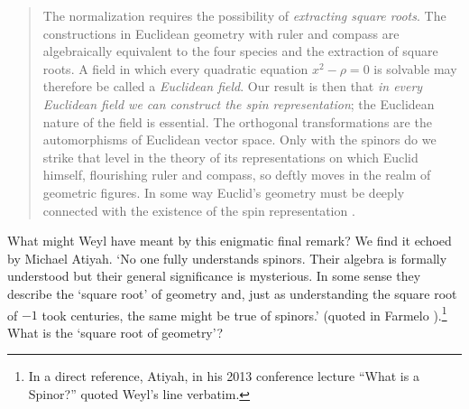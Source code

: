 \documentclass[11pt,oneside,a4paper]{article}
\begin{document}
\begin{quotation}
The normalization requires the possibility of \textit{extracting square roots}. The constructions in Euclidean geometry with ruler and compass are algebraically equivalent to the four species and the extraction of square roots. A field in which every quadratic equation  $x^{2} - \rho = 0$ is solvable may therefore be called a \textit{Euclidean field}. Our result is then that \textit{in every Euclidean field we can construct the spin representation}; the Euclidean nature of the field is essential. The orthogonal transformations are the automorphisms of Euclidean vector space. Only with the spinors do we strike that level in the theory of its representations on which Euclid himself, flourishing ruler and compass, so deftly moves in the realm of geometric figures. In some way Euclid's geometry must be deeply connected with the existence of the spin representation \parencite[273]{weyl_classical_1939}.
\end{quotation}
What might Weyl have meant by this enigmatic final remark? We find it echoed by Michael Atiyah. `No one fully understands spinors. Their algebra is formally understood but their general significance is mysterious. In some sense they describe the `square root' of geometry and, just as understanding the square root of $-1$ took centuries, the same might be true of spinors.' (quoted in Farmelo \parencite*{farmelo_strangest_2009}).\footnote{In a direct reference, Atiyah, in his 2013 conference lecture ``What is a Spinor?'' quoted Weyl's line verbatim.} What is the `square root of geometry'?
\end{document}
